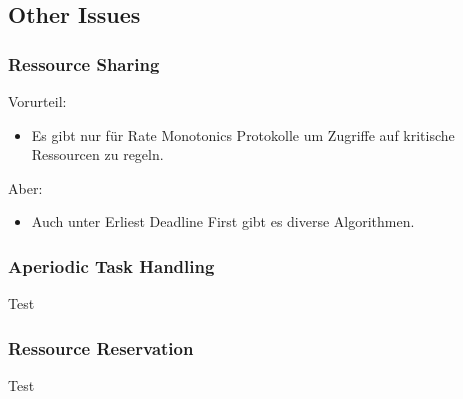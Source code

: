 \subsection{Other Issues}
\subsubsection{Ressource Sharing}
\begin{frame}{\subsubsecname}
	Vorurteil:
	\begin{itemize}
		\item Es gibt nur für Rate Monotonics Protokolle um Zugriffe auf kritische Ressourcen zu regeln.
	\end{itemize}\pause
	Aber:
	\begin{itemize}
		\item Auch unter Erliest Deadline First gibt es diverse Algorithmen.
	\end{itemize}
\end{frame}

\subsubsection{Aperiodic Task Handling}
\begin{frame}{\subsubsecname}
	Test
\end{frame}

\subsubsection{Ressource Reservation}
\begin{frame}{\subsubsecname}
	Test
\end{frame}